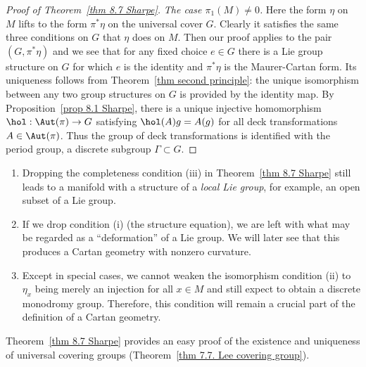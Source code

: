 \begin{proof}[Proof of Theorem~\ref{thm 8.7 Sharpe}]
    \emph{The case $\pi_1(M)\neq 0$.} Here the form $\eta$ on $M$ lifts to the form $\pi^\ast \eta$ on the universal cover $G$. Clearly it satisfies the same three conditions on $G$ that $\eta$ does on $M$. Then our proof applies to the pair $(G,\pi^\ast\eta)$ and we see that for any fixed choice $e\in G$ there is a Lie group structure on $G$ for which $e$ is the identity and $\pi^\ast\eta$ is the Maurer-Cartan form. Its uniqueness follows from Theorem~\ref{thm second principle}: the unique isomorphism between any two group structures on $G$ is provided by the identity map. By Proposition~\ref{prop 8.1 Sharpe}, there is a unique injective homomorphism $\hol:\Aut(\pi)\to G$ satisfying $\hol(A)g=A(g)$ for all deck transformations $A\in \Aut(\pi)$. Thus the group of deck transformations is identified with the period group, a discrete subgroup $\varGamma\subset G$.
\end{proof}

\begin{rem}
    \begin{enumerate}
        \item Dropping the completeness condition (iii) in Theorem~\ref{thm 8.7 Sharpe} still leads to a manifold with a structure of a \emph{local Lie group}, for example, an open subset of a Lie group.
        \item If we drop condition (i) (the structure equation), we are left with what may be regarded as a ``deformation'' of a Lie group. We will later see that this produces a Cartan geometry with nonzero curvature.
        \item Except in special cases, we cannot weaken the isomorphism condition (ii) to $\eta_x$ being merely an injection for all $x\in M$ and still expect to obtain a discrete monodromy group. Therefore, this condition will remain a crucial part of the definition of a Cartan geometry.
    \end{enumerate}
\end{rem}

Theorem~\ref{thm 8.7 Sharpe} provides an easy proof of the existence and uniqueness of universal covering groups (Theorem~\ref{thm 7.7. Lee covering group}).

